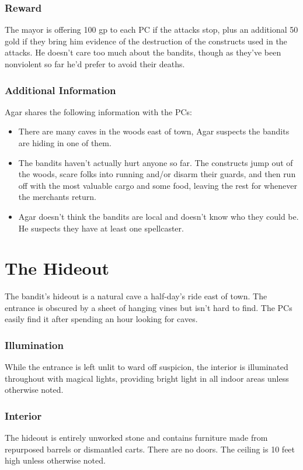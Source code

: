 \documentclass[10pt,a4paper,twoside,bg=print,twocolumn,openany,nodeprecatedcode]{dndbook}
\begin{document}
\subsubsection{Reward}
The mayor is offering 100 gp to each PC if the attacks stop, plus an additional 50 gold if they bring him evidence of the destruction of the constructs used in the attacks. He doesn't care too much about the bandits, though as they've been nonviolent so far he'd prefer to avoid their deaths.

\subsubsection{Additional Information}
Agar shares the following information with the PCs:


\begin{itemize}
\item There are many caves in the woods east of town, Agar suspects the bandits are hiding in one of them.
\item The bandits haven't actually hurt anyone so far. The constructs jump out of the woods, scare folks into running and/or disarm their guards, and then run off with the most valuable cargo and some food, leaving the rest for whenever the merchants return.
\item Agar doesn't think the bandits are local and doesn't know who they could be. He suspects they have at least one spellcaster.
\end{itemize}

\section{The Hideout}
The bandit's hideout is a natural cave a half-day's ride east of town. The entrance is obscured by a sheet of hanging vines but isn't hard to find. The PCs easily find it after spending an hour looking for caves.

\subsubsection{Illumination}
While the entrance is left unlit to ward off suspicion, the interior is illuminated throughout with magical lights, providing bright light in all indoor areas unless otherwise noted.

\subsubsection{Interior}
The hideout is entirely unworked stone and contains furniture made from repurposed barrels or dismantled carts. There are no doors. The ceiling is 10 feet high unless otherwise noted.
\end{document}
